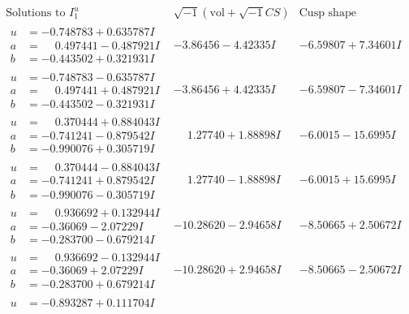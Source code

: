 \documentclass[1p]{elsarticle_modified}
\theoremstyle{definition}
\newcommand{\I}{\sqrt{-1}}
\begin{document}
$$\begin{array}{c|c|c}  
\text{Solutions to }I^u_{1}& \I (\text{vol} + \sqrt{-1}CS) & \text{Cusp shape}\\
 \hline 
\begin{aligned}
u &= -0.748783 + 0.635787 I \\
a &= \phantom{-}0.497441 - 0.487921 I \\
b &= -0.443502 + 0.321931 I\end{aligned}
 & -3.86456 - 4.42335 I & -6.59807 + 7.34601 I \\ \hline\begin{aligned}
u &= -0.748783 - 0.635787 I \\
a &= \phantom{-}0.497441 + 0.487921 I \\
b &= -0.443502 - 0.321931 I\end{aligned}
 & -3.86456 + 4.42335 I & -6.59807 - 7.34601 I \\ \hline\begin{aligned}
u &= \phantom{-}0.370444 + 0.884043 I \\
a &= -0.741241 - 0.879542 I \\
b &= -0.990076 + 0.305719 I\end{aligned}
 & \phantom{-}1.27740 + 1.88898 I & -6.0015 - 15.6995 I \\ \hline\begin{aligned}
u &= \phantom{-}0.370444 - 0.884043 I \\
a &= -0.741241 + 0.879542 I \\
b &= -0.990076 - 0.305719 I\end{aligned}
 & \phantom{-}1.27740 - 1.88898 I & -6.0015 + 15.6995 I \\ \hline\begin{aligned}
u &= \phantom{-}0.936692 + 0.132944 I \\
a &= -0.36069 - 2.07229 I \\
b &= -0.283700 - 0.679214 I\end{aligned}
 & -10.28620 - 2.94658 I & -8.50665 + 2.50672 I \\ \hline\begin{aligned}
u &= \phantom{-}0.936692 - 0.132944 I \\
a &= -0.36069 + 2.07229 I \\
b &= -0.283700 + 0.679214 I\end{aligned}
 & -10.28620 + 2.94658 I & -8.50665 - 2.50672 I \\ \hline\begin{aligned}
u &= -0.893287 + 0.111704 I \\

\end{aligned}
\end{array}$$
\end{document}
